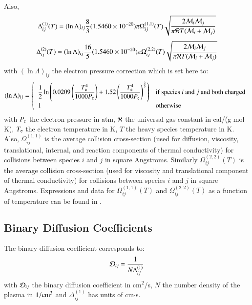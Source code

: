 \documentclass{warpdoc}
\newcommand{\mfd}{\displaystyle}
\begin{document}
Also,
%
\begin{equation}
    \Delta_{ij}^{(1)}(T)=(\ln \Lambda)_{ij}\frac{8}{3} (1.5460 \times 10^{-20}) \pi \Omega_{ij}^{(1,1)}(T) \sqrt{\frac{2 {\cal M}_i {\cal M}_j}{\pi {\cal R} T ({\cal M}_i + {\cal M}_j)} }
\end{equation}
%
%
\begin{equation}
    \Delta_{ij}^{(2)}(T)=(\ln \Lambda)_{ij} \frac{16}{5} (1.5460 \times 10^{-20}) \pi \Omega_{ij}^{(2,2)}(T) \sqrt{\frac{2 {\cal M}_i {\cal M}_j}{\pi {\cal R} T ({\cal M}_i + {\cal M}_j)} }
\end{equation}
%
with $(\ln \Lambda)_{ij}$ the electron pressure correction which is set here to:
%
\begin{equation}
  (\ln \Lambda)_{ij}=\left\{ \begin{array}{ll}\mfd\frac{1}{2} \ln \left( \mfd 0.0209 \left( \frac{T_{\rm e}^4}{1000 P_{\rm e} }\right) + 1.52 \left( \frac{T_{\rm e}^4}{1000 P_{\rm e} }\right)^\frac{2}{3}
  \right)
  & \textrm{if species $i$ and $j$ and both charged}\\
  1 & {\rm otherwise}  
  \end{array}
  \right.
\end{equation}
%
with $P_{\rm e}$ the electron pressure in atm, $\cal R$ the universal gas constant in cal/(g-mol K), $T_{\rm e}$ the electron temperature in K, $T$ the heavy species temperature in K. Also, $\Omega_{ij}^{(1,1)}$ is the average collision cross-section (used for diffusion, viscosity, translational, internal, and reaction components of
thermal conductivity) for collisions between species $i$ and $j$ in square Angstroms. Similarly $\Omega_{ij}^{(2,2)}(T)$ is the average collision cross-section (used for viscosity and translational component of thermal conductivity) for collisions between species $i$ and $j$ in square Angstroms.  Expressions and data for $\Omega_{ij}^{(1,1)}(T)$ and $\Omega_{ij}^{(2,2)}(T)$ as a function of temperature can be found in \cite{nasa:1990:gupta}.

\subsection{Binary Diffusion Coefficients}

The binary diffusion coefficient corresponds to:
%
\begin{equation}
    {\cal D}_{ij}=\frac{1}{N \Delta_{ij}^{(1)}}
    \label{eqn:GY:Dij}
\end{equation}
%
with ${\cal D}_{ij}$ the binary diffusion coefficient in cm$^2$/s, $N$ the number density of the plasma in $1/{\rm cm}^3$ and $\Delta_{ij}^{(1)}$ has units of cm$\cdot$s.
\end{document}
